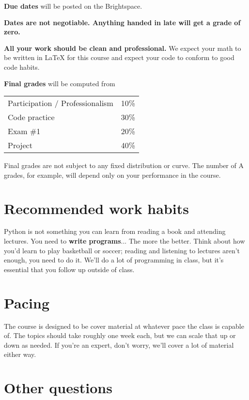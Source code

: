 \documentclass[12pt,pdftex,twoside,letterpaper]{exam}
\begin{document}
    {\bf Due dates} will be posted on the Brightspace.

    {\bf Dates are not negotiable. Anything handed in late will get a grade of zero.}

    {\bf All your work should be clean and professional.} We expect your math to be written in
    LaTeX for this course and expect your code to conform to good code habits.

    {\bf Final grades\/} will be computed from

    \begin{center}
      \begin{tabular}{ll}
        Participation / Professionalism & 10\% \\
        Code practice & 30\% \\
        Exam \#1        & 20\% \\
        Project        & 40\% \\
      \end{tabular}
    \end{center}

    Final grades are not subject to any fixed distribution or curve. The number of A grades, for
    example, will depend only on your performance in the course.

\section*{Recommended work habits}

  Python is not something you can learn from reading a book and attending lectures. You need to
  {\bf write programs}... The more the better. Think about how you'd learn to play basketball
  or soccer; reading and listening to lectures aren't enough, you need to do it. We'll do a lot of
  programming in class, but it's {essential} that you follow up outside of class.

\section*{Pacing}

  The course is designed to be cover material at whatever pace the class is capable of. The topics
  should take roughly one week each, but we can scale that up or down as needed. If you're an expert,
  don't worry, we'll cover a lot of material either way.

\section*{Other questions}
\end{document}
